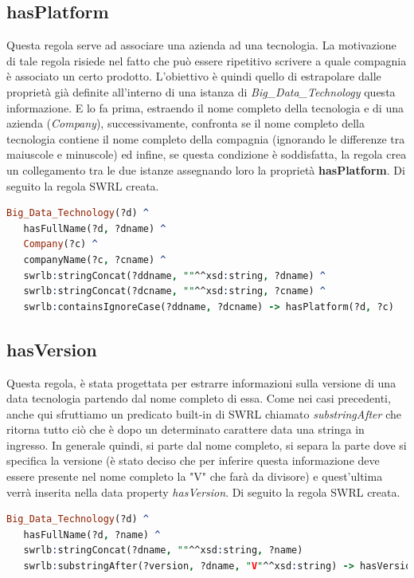 \subsection{hasPlatform}
Questa regola serve ad associare una azienda ad una tecnologia. La motivazione di tale regola risiede nel fatto che può essere ripetitivo scrivere a quale compagnia è associato un certo prodotto. L'obiettivo è quindi quello di estrapolare dalle proprietà già definite all'interno di una istanza di \textit{Big\_Data\_Technology} questa informazione. E lo fa prima, estraendo il nome completo della tecnologia e di una azienda (\textit{Company}), successivamente, confronta se il nome completo della tecnologia contiene il nome completo della compagnia (ignorando le differenze tra maiuscole e minuscole) ed infine, se questa condizione è soddisfatta, la regola crea un collegamento tra le due istanze assegnando loro la proprietà \textbf{hasPlatform}. Di seguito la regola SWRL creata.\\

\begin{lstlisting}[language=Prolog]
Big_Data_Technology(?d) ^ 
   hasFullName(?d, ?dname) ^ 
   Company(?c) ^
   companyName(?c, ?cname) ^
   swrlb:stringConcat(?ddname, ""^^xsd:string, ?dname) ^
   swrlb:stringConcat(?dcname, ""^^xsd:string, ?cname) ^
   swrlb:containsIgnoreCase(?ddname, ?dcname) -> hasPlatform(?d, ?c)
\end{lstlisting}

\subsection{hasVersion}
Questa regola, è stata progettata per estrarre informazioni sulla versione di una data tecnologia partendo dal nome completo di essa. Come nei casi precedenti, anche qui sfruttiamo un predicato built-in di SWRL chiamato \textit{substringAfter} che ritorna tutto ciò che è dopo un determinato carattere data una stringa in ingresso. In generale quindi, si parte dal nome completo, si separa la parte dove si specifica la versione (è stato deciso che per inferire questa informazione deve essere presente nel nome completo la "V" che farà da divisore) e quest'ultima verrà inserita nella data property \textit{hasVersion}. Di seguito la regola SWRL creata.\\

\begin{lstlisting}[language=Prolog]
Big_Data_Technology(?d) ^ 
   hasFullName(?d, ?name) ^
   swrlb:stringConcat(?dname, ""^^xsd:string, ?name)
   swrlb:substringAfter(?version, ?dname, "V"^^xsd:string) -> hasVersion(?d, ?version)
\end{lstlisting}
\newpage
